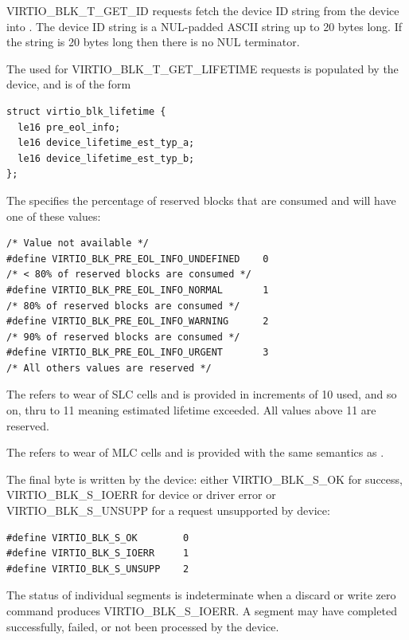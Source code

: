 VIRTIO_BLK_T_GET_ID requests fetch the device ID string from the device into
.  The device ID string is a NUL-padded ASCII string up to 20 bytes
long.  If the string is 20 bytes long then there is no NUL terminator.

The  used for VIRTIO_BLK_T_GET_LIFETIME requests is populated
by the device, and is of the form

\begin{lstlisting}
struct virtio_blk_lifetime {
  le16 pre_eol_info;
  le16 device_lifetime_est_typ_a;
  le16 device_lifetime_est_typ_b;
};
\end{lstlisting}

The  specifies the percentage of reserved blocks
that are consumed and will have one of these values:

\begin{lstlisting}
/* Value not available */
#define VIRTIO_BLK_PRE_EOL_INFO_UNDEFINED    0
/* < 80% of reserved blocks are consumed */
#define VIRTIO_BLK_PRE_EOL_INFO_NORMAL       1
/* 80% of reserved blocks are consumed */
#define VIRTIO_BLK_PRE_EOL_INFO_WARNING      2
/* 90% of reserved blocks are consumed */
#define VIRTIO_BLK_PRE_EOL_INFO_URGENT       3
/* All others values are reserved */
\end{lstlisting}

The  refers to wear of SLC cells and is provided
in increments of 10%
used, and so on, thru to 11 meaning estimated lifetime exceeded.
All values above 11 are reserved.

The  refers to wear of MLC cells and is provided
with the same semantics as .

The final  byte is written by the device: either
VIRTIO_BLK_S_OK for success, VIRTIO_BLK_S_IOERR for device or driver
error or VIRTIO_BLK_S_UNSUPP for a request unsupported by device:

\begin{lstlisting}
#define VIRTIO_BLK_S_OK        0
#define VIRTIO_BLK_S_IOERR     1
#define VIRTIO_BLK_S_UNSUPP    2
\end{lstlisting}

The status of individual segments is indeterminate when a discard or write zero
command produces VIRTIO_BLK_S_IOERR.  A segment may have completed
successfully, failed, or not been processed by the device.


